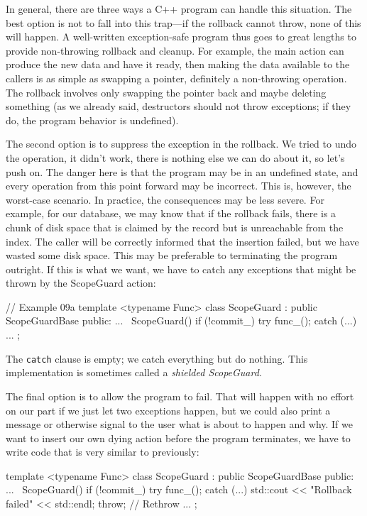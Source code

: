 In general, there are three ways a C++ program can handle this situation. The best option is not to fall into this trap---if the rollback cannot throw, none of this will happen. A well-written exception-safe program thus goes to great lengths to provide non-throwing rollback and cleanup. For example, the main action can produce the new data and have it ready, then making the data available to the callers is as simple as swapping a pointer, definitely a non-throwing operation. The rollback involves only swapping the pointer back and maybe deleting something (as we already said, destructors should not throw exceptions; if they do, the program behavior is undefined).

The second option is to suppress the exception in the rollback. We tried to undo the operation, it didn't work, there is nothing else we can do about it, so let's push on. The danger here is that the program may be in an undefined state, and every operation from this point forward may be incorrect. This is, however, the worst-case scenario. In practice, the consequences may be less severe. For example, for our database, we may know that if the rollback fails, there is a chunk of disk space that is claimed by the record but is unreachable from the index. The caller will be correctly informed that the insertion failed, but we have wasted some disk space. This may be preferable to terminating the program outright. If this is what we want, we have to catch any exceptions that might be thrown by the ScopeGuard action:

\begin{code}
// Example 09a
template <typename Func>
class ScopeGuard : public ScopeGuardBase {
  public:
  ...
  ~ScopeGuard() {
    if (!commit_) try { func_(); } catch (...) {}
  }
  ...
};
\end{code}

The \texttt{catch} clause is empty; we catch everything but do nothing. This implementation is sometimes called a \emph{shielded ScopeGuard}.

The final option is to allow the program to fail. That will happen with no effort on our part if we just let two exceptions happen, but we could also print a message or otherwise signal to the user what is about to happen and why. If we want to insert our own dying action before the program terminates, we have to write code that is very similar to previously:

\begin{code}
template <typename Func>
class ScopeGuard : public ScopeGuardBase {
  public:
  ...
  ~ScopeGuard() {
    if (!commit_) try { func_(); } catch (...) {
      std::cout << "Rollback failed" << std::endl;
      throw;    // Rethrow
    }
  }
  ...
};
\end{code}

